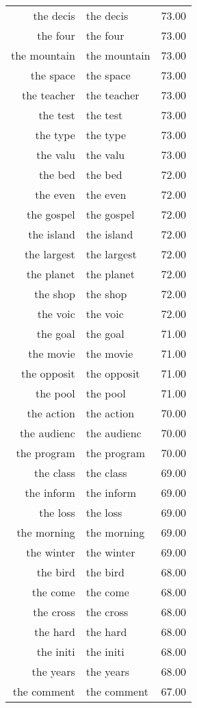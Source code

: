 \begin{table}[ht]
\begin{tabular}{rlr}
  the decis & the decis & 73.00 \\ 
  the four & the four & 73.00 \\ 
  the mountain & the mountain & 73.00 \\ 
  the space & the space & 73.00 \\ 
  the teacher & the teacher & 73.00 \\ 
  the test & the test & 73.00 \\ 
  the type & the type & 73.00 \\ 
  the valu & the valu & 73.00 \\ 
  the bed & the bed & 72.00 \\ 
  the even & the even & 72.00 \\ 
  the gospel & the gospel & 72.00 \\ 
  the island & the island & 72.00 \\ 
  the largest & the largest & 72.00 \\ 
  the planet & the planet & 72.00 \\ 
  the shop & the shop & 72.00 \\ 
  the voic & the voic & 72.00 \\ 
  the goal & the goal & 71.00 \\ 
  the movie & the movie & 71.00 \\ 
  the opposit & the opposit & 71.00 \\ 
  the pool & the pool & 71.00 \\ 
  the action & the action & 70.00 \\ 
  the audienc & the audienc & 70.00 \\ 
  the program & the program & 70.00 \\ 
  the class & the class & 69.00 \\ 
  the inform & the inform & 69.00 \\ 
  the loss & the loss & 69.00 \\ 
  the morning & the morning & 69.00 \\ 
  the winter & the winter & 69.00 \\ 
  the bird & the bird & 68.00 \\ 
  the come & the come & 68.00 \\ 
  the cross & the cross & 68.00 \\ 
  the hard & the hard & 68.00 \\ 
  the initi & the initi & 68.00 \\ 
  the years & the years & 68.00 \\ 
  the comment & the comment & 67.00 \\ 

\end{tabular}
\end{table}
